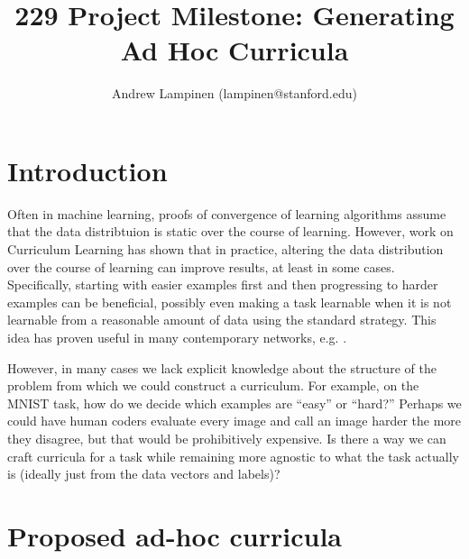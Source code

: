 \documentclass[11pt]{article}
\begin{document}
 
\setcounter{secnumdepth}{1}
\title{229 Project Milestone: Generating Ad Hoc Curricula}
\author{Andrew Lampinen (lampinen@stanford.edu)}
\date{}
\maketitle

\section{Introduction}
Often in machine learning, proofs of convergence of learning algorithms assume that the data distribtuion is static over the course of learning. However, work on Curriculum Learning \cite{Bengio2009} has shown that in practice, altering the data distribution over the course of learning can improve results, at least in some cases. Specifically, starting with easier examples first and then progressing to harder examples can be beneficial, possibly even making a task learnable when it is not learnable from a reasonable amount of data using the standard strategy. This idea has proven useful in many contemporary networks, e.g. \cite{Graves2016}.\par
However, in many cases we lack explicit knowledge about the structure of the problem from which we could construct a curriculum. For example, on the MNIST task, how do we decide which examples are ``easy'' or ``hard?'' Perhaps we could have human coders evaluate every image and call an image harder the more they disagree, but that would be prohibitively expensive. Is there a way we can craft curricula for a task while remaining more agnostic to what the task actually is (ideally just from the data vectors and labels)?
\section{Proposed ad-hoc curricula}
\end{document}
